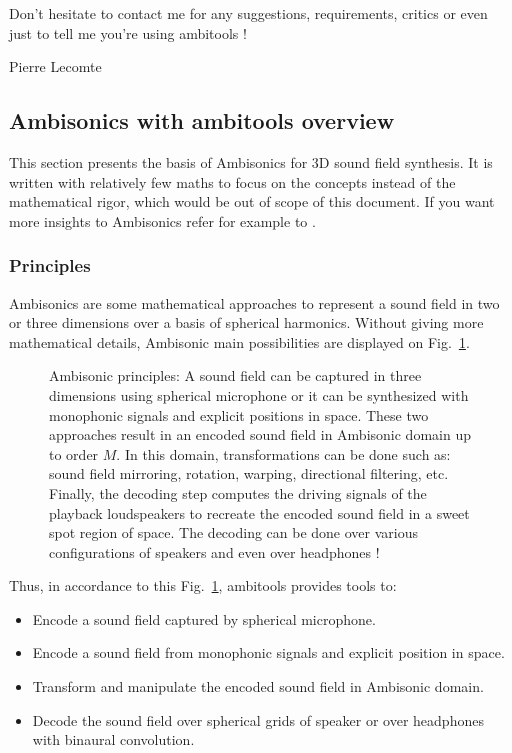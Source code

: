 \documentclass[10pt,a4paper]{article}
\begin{document}
Don't hesitate to contact me for any suggestions, requirements, critics or even just to tell me you're using ambitools !

\begin{flushright}
Pierre Lecomte
\end{flushright}

\subsection{Ambisonics with ambitools overview}
This section presents the basis of Ambisonics for 3D sound field synthesis. It is written with relatively few maths to focus on the concepts instead of the mathematical rigor, which would be out of scope of this document. If you want more insights to Ambisonics refer for example to \cite{daniel2000representation,poletti2005three,ahrens2012analytic}.

\subsubsection{Principles}
Ambisonics are some mathematical approaches to represent a sound field in two or three dimensions over a basis of spherical harmonics. Without giving more mathematical details, Ambisonic main possibilities are displayed on Fig.~\ref{fig:ambisonics}.
\begin{figure}[!ht]
	\centering
	\def\svgwidth{\columnwidth}
	
	\caption{Ambisonic principles: A sound field can be captured in three dimensions using spherical microphone or it can be synthesized with monophonic signals and explicit positions in space. These two approaches result in an encoded sound field in Ambisonic domain up to order $M$. In this domain, transformations can be done such as: sound field mirroring, rotation, warping, directional filtering, etc. Finally, the decoding step computes the driving signals of the playback loudspeakers to recreate the encoded sound field in a sweet spot region of space. The decoding can be done over various configurations of speakers and even over headphones !}
	\label{fig:ambisonics}
\end{figure}

Thus, in accordance to this Fig.~\ref{fig:ambisonics}, ambitools provides tools to:
\begin{itemize}
\item Encode a sound field captured by spherical microphone.
\item Encode a sound field from monophonic signals and explicit position in space.
\item Transform and manipulate the encoded sound field in Ambisonic domain.
\item Decode the sound field over spherical grids of speaker or over headphones with binaural convolution.
\end{itemize}
\end{document}
